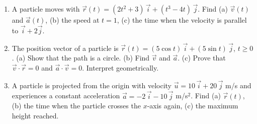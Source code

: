 \documentclass[11pt]{article}
\begin{document}
\begin{exercice}[Practice]
\begin{enumerate}
\item A particle moves with $\vec{r}(t) = (2t^2 + 3)\,\vec{i} + (t^3 - 4t)\,\vec{j}$. Find (a) $\vec{v}(t)$ and $\vec{a}(t)$, (b) the speed at $t=1$, (c) the time when the velocity is parallel to $\vec{i} + 2\vec{j}$.
\item The position vector of a particle is $\vec{r}(t) = (5\cos t)\,\vec{i} + (5\sin t)\,\vec{j}$, $t\ge 0$. (a) Show that the path is a circle. (b) Find $\vec{v}$ and $\vec{a}$. (c) Prove that $\vec{v} \cdot \vec{r} = 0$ and $\vec{a} \cdot \vec{v} = 0$. Interpret geometrically.
\item A particle is projected from the origin with velocity $\vec{u} = 10\,\vec{i} + 20\,\vec{j}$ m/s and experiences a constant acceleration $\vec{a} = -2\,\vec{i} - 10\,\vec{j}$ m/s$^2$. Find (a) $\vec{r}(t)$, (b) the time when the particle crosses the $x$-axis again, (c) the maximum height reached.
\end{enumerate}
\end{exercice}
\end{document}
